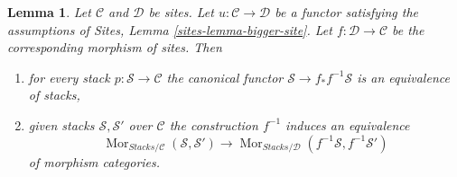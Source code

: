 \documentclass{stacks-project}
\theoremstyle{plain}
\newtheorem{lemma}[subsection]{Lemma}
\theoremstyle{definition}
\theoremstyle{remark}
\numberwithin{equation}{subsection}
\def\Mor{\mathop{\mathrm{Mor}}\nolimits}
\begin{document}
\begin{lemma}
\label{lemma-bigger-site}
Let $\mathcal{C}$ and $\mathcal{D}$ be sites.
Let $u : \mathcal{C} \to \mathcal{D}$ be a functor satisfying the
assumptions of
Sites, Lemma \ref{sites-lemma-bigger-site}.
Let $f : \mathcal{D} \to \mathcal{C}$ be the corresponding
morphism of sites. Then
\begin{enumerate}
\item for every stack $p : \mathcal{S} \to \mathcal{C}$ the
canonical functor $\mathcal{S} \to f_*f^{-1}\mathcal{S}$ is
an equivalence of stacks,
\item given stacks $\mathcal{S}, \mathcal{S}'$ over $\mathcal{C}$
the construction $f^{-1}$
induces an equivalence
$$
\Mor_{\textit{Stacks}/\mathcal{C}}(\mathcal{S}, \mathcal{S}')
\longrightarrow
\Mor_{\textit{Stacks}/\mathcal{D}}(f^{-1}\mathcal{S}, f^{-1}\mathcal{S}')
$$
of morphism categories.
\end{enumerate}
\end{lemma}
\end{document}
